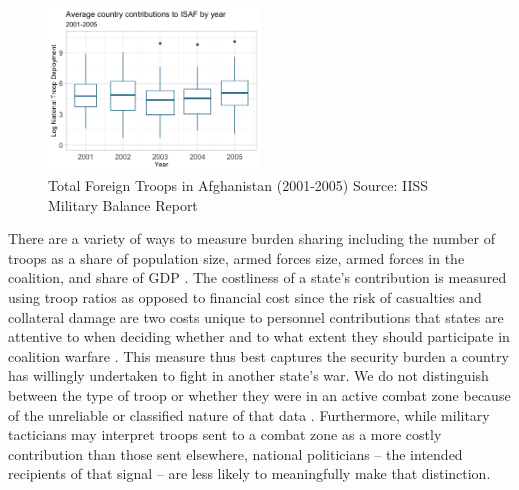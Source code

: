 \documentclass[12pt,letterpaper]{article}
\begin{document}
		\begin{figure}[H]
			\centering
			\includegraphics[width=0.5\textwidth]{figures/country_troop_boxplot.png}
			\caption{Total Foreign Troops in Afghanistan (2001-2005) Source: IISS Military Balance Report}
			\label{fig:afghan_total}
		\end{figure}
		
		There are a variety of ways to measure burden sharing including the number of troops as a share of population size, armed forces size, armed forces in the coalition, and share of GDP \citep[668-669]{hartley_natoburdensharingfuture_1999}. The costliness of a state's contribution is measured using troop ratios as opposed to financial cost since the risk of casualties and collateral damage are two costs unique to personnel contributions that states are attentive to when deciding whether and to what extent they should participate in coalition warfare \citep{ringsmose_natoburdensharingredux_2010, chivvis_topplingqaddafilibya_2014, vonhlatky_cashcombatamerica_2015, haesebrouck_natoburdensharing_2017}. This measure thus best captures the security burden a country has willingly undertaken to fight in another state's war. We do not distinguish between the type of troop or whether they were in an active combat zone because of the unreliable or classified nature of that data \citep[44-45]{bogers_missionafghanistanwho_2013}. Furthermore, while military tacticians may interpret troops sent to a combat zone as a more costly contribution than those sent elsewhere, national politicians -- the intended recipients of that signal -- are less likely to meaningfully make that distinction.
\end{document}
